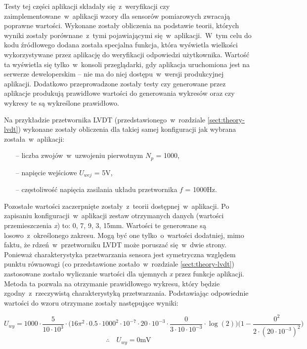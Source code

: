 Testy tej części aplikacji składały się~z~weryfikacji czy zaimplementowane~w~aplikacji wzory dla
sensorów pomiarowych zwracają poprawne wartości. Wykonane zostały obliczenia na podstawie teorii,
których wyniki zostały porównane~z~tymi pojawiającymi się~w~aplikacji.~W~tym celu do kodu źródłowego
dodana została specjalna funkcja, która wyświetla wielkości wykorzystywane przez aplikację do
weryfikacji odpowiedzi użytkownika. Wartość ta wyświetla się tylko~w~konsoli przeglądarki, gdy
aplikacja uruchomiona jest na serwerze deweloperskim -- nie ma do niej dostępu~w~wersji produkcyjnej
aplikacji. Dodatkowo przeprowadzone zostały testy czy generowane przez aplikacje produkują
prawidłowe wartości do generowania wykresów oraz czy wykresy te są wykreślone prawidłowo.

Na przykładzie przetwornika LVDT (przedstawionego~w~rozdziale
\ref{sect:theory-lvdt}) wykonane zostały obliczenia dla takiej samej konfiguracji jak wybrana
została~w~aplikacji:
\begin{itemize}
  \item [--]  liczba zwojów~w~uzwojeniu pierwotnym $N_p$ = 1000,
  \item [--]  napięcie wejściowe $U_{wej}$ = 5V,
  \item [--]  częstoliwość napięcia zasilania układu przetwornika $f$ = 1000Hz.
\end{itemize}
Pozostałe wartości zaczerpnięte zostały~z~teorii dostępnej~w~aplikacji. Po zapisaniu
konfiguracji~w~aplikacji zestaw otrzymanych danych (wartości przemieszczenia \textit{\textrm{x}})
to: 0, 7, 9, 3, 15mm. Wartości te generowane są losowo~z~określonego zakresu. Mogą być one
tylko~o~wartości dodatniej, mimo faktu, że rdzeń~w~przetworniku LVDT może poruszać się~w~dwie
strony. Ponieważ charakterystyka przetwarzania sensora jest symetryczna względem punktu równowagi
(co przedstawione zostało~w~rozdziale \ref{sect:theory-lvdt}) zastosowane zostało wyliczanie
wartości dla ujemnych \textit{\textrm{x}} przez funkcje aplikacji. Metoda ta pozwala na otrzymanie
prawidłowego wykresu, który będzie zgodny~z~rzeczywistą charakterystyką przetwarzania. Podstawiając
odpowiednie wartości do wzoru otrzymane zostały następujące wyniki:

\begin{equation*}
  U_{wy} =1000\cdot \frac{5}{10\cdot 10^3}\cdot\bigg(16\pi^2\cdot 0.5\cdot 1000^2\cdot
  10^{-7}\cdot 20\cdot 10^{-3}\cdot\frac{0}{3\cdot 10\cdot 10^{-3}}\cdot\log{(2)}\bigg)
  \bigg(1-\frac{0^2}{2\cdot (20\cdot 10^{-3})^2}\bigg)
\end{equation*}
\begin{equation*}
  \therefore\quad U_{wy} = 0\text{mV}
\end{equation*}

